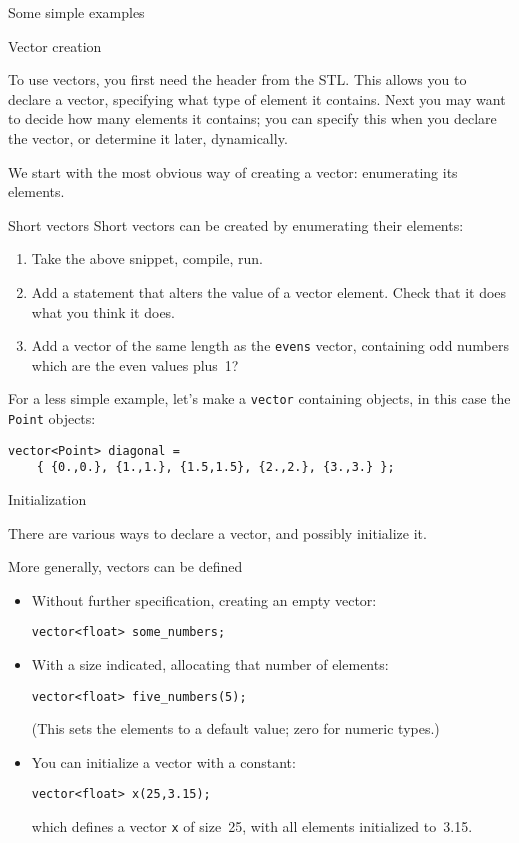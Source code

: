  {Some simple examples}

 {Vector creation}

To use vectors, you first need the  header from the \ac{STL}.
This allows you to declare a vector, specifying what type of element
it contains. Next you may want to decide how many elements it
contains; you can specify this when you declare the vector, or
determine it later, dynamically.

We start with the most obvious way of creating a vector:
enumerating its elements.

\begin{block}{Short vectors}
  \label{sl:vectorshort}
  Short vectors can be created by enumerating their elements:
  \lstset{style=snippetcode}
\end{block}

\begin{exercise}
  \label{ex:shortvectoralter}
  \begin{enumerate}
  \item
    Take the above snippet, compile, run.
  \item Add a statement that alters the value of a vector element.
    Check that it does what you think it does.
  \item Add a vector of the same length as the \lstinline{evens} vector,
    containing odd numbers
    which are the even values plus~1?
  \end{enumerate}
\end{exercise}

For a less simple example, let's make a \lstinline{vector}
containing objects, in this case the \lstinline{Point} objects:
\begin{lstlisting}
vector<Point> diagonal = 
    { {0.,0.}, {1.,1.}, {1.5,1.5}, {2.,2.}, {3.,3.} };
\end{lstlisting}

 {Initialization}

There are various ways to declare a vector, and possibly initialize it.

More generally, vectors can be defined
\begin{itemize}
\item Without further specification, creating an empty vector:
\begin{lstlisting}
vector<float> some_numbers;
\end{lstlisting}
\item With a size indicated, allocating that number of elements:
\begin{lstlisting}
vector<float> five_numbers(5);
\end{lstlisting}
(This sets the elements to a default value; zero for numeric types.)
\item You can initialize a vector with a constant:
\begin{lstlisting}
vector<float> x(25,3.15);
\end{lstlisting}
which defines a vector \lstinline{x} of size~25,
with all elements initialized to~3.15.
\end{itemize}

